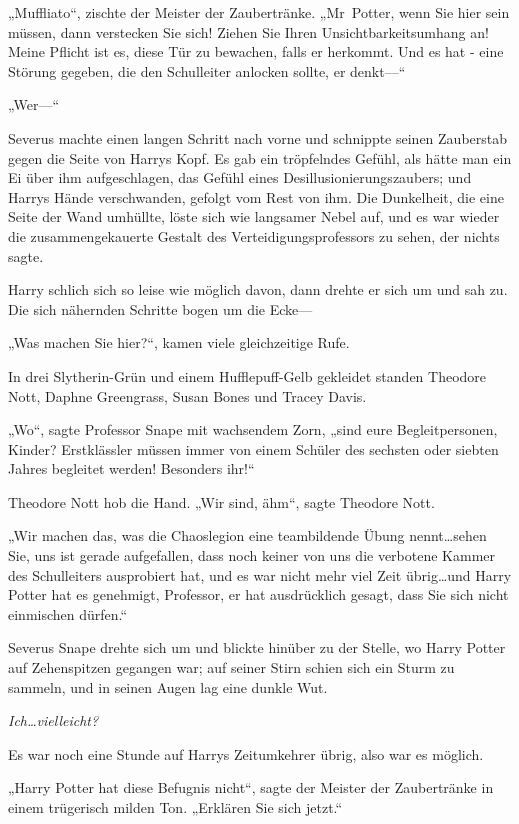 {„Muffliato“, zischte der Meister der Zaubertränke. „Mr~Potter, wenn Sie hier sein müssen, dann verstecken Sie sich! Ziehen Sie Ihren Unsichtbarkeitsumhang an! Meine Pflicht ist es, diese Tür zu bewachen, falls er herkommt. Und es hat - eine Störung gegeben, die den Schulleiter anlocken sollte, er denkt—“

„Wer—“

Severus machte einen langen Schritt nach vorne und schnippte seinen Zauberstab gegen die Seite von Harrys Kopf. Es gab ein tröpfelndes Gefühl, als hätte man ein Ei über ihm aufgeschlagen, das Gefühl eines Desillusionierungszaubers; und Harrys Hände verschwanden, gefolgt vom Rest von ihm. Die Dunkelheit, die eine Seite der Wand umhüllte, löste sich wie langsamer Nebel auf, und es war wieder die zusammengekauerte Gestalt des Verteidigungsprofessors zu sehen, der nichts sagte.

Harry schlich sich so leise wie möglich davon, dann drehte er sich um und sah zu. Die sich nähernden Schritte bogen um die Ecke—

„Was machen Sie hier?“, kamen viele gleichzeitige Rufe.

In drei Slytherin-Grün und einem Hufflepuff-Gelb gekleidet standen Theodore Nott, Daphne Greengrass, Susan Bones und Tracey Davis.

„Wo“, sagte Professor Snape mit wachsendem Zorn, „sind eure Begleitpersonen, Kinder? Erstklässler müssen immer von einem Schüler des sechsten oder siebten Jahres begleitet werden! Besonders ihr!“

Theodore Nott hob die Hand. „Wir sind, ähm“, sagte Theodore Nott.

„Wir machen das, was die Chaoslegion eine teambildende Übung nennt…sehen Sie, uns ist gerade aufgefallen, dass noch keiner von uns die verbotene Kammer des Schulleiters ausprobiert hat, und es war nicht mehr viel Zeit übrig…und Harry Potter hat es genehmigt, Professor, er hat ausdrücklich gesagt, dass Sie sich nicht einmischen dürfen.“

Severus Snape drehte sich um und blickte hinüber zu der Stelle, wo Harry Potter auf Zehenspitzen gegangen war; auf seiner Stirn schien sich ein Sturm zu sammeln, und in seinen Augen lag eine dunkle Wut.

\emph{Ich…vielleicht?}

Es war noch eine Stunde auf Harrys Zeitumkehrer übrig, also war es möglich.

„Harry Potter hat diese Befugnis nicht“, sagte der Meister der Zaubertränke in einem trügerisch milden Ton. „Erklären Sie sich jetzt.“

}
